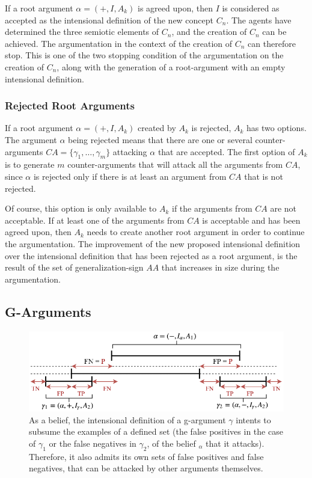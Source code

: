 If a root argument $\alpha = (+,I,A_{k})$ is agreed upon, then $I$ is considered as accepted as the intensional definition of the new concept $C_{n}$. The agents have determined the three semiotic elements of $C_{n}$, and the creation of $C_{n}$ can be achieved. The argumentation in the context of the creation of $C_{n}$ can therefore stop. This is one of the two stopping condition of the argumentation on the creation of $C_{n}$, along with the generation of a root-argument with an empty intensional definition. 
 
\subsubsection{Rejected Root Arguments}

If a root argument $\alpha = (+,I,A_{k})$ created by $A_{k}$ is rejected, $A_{k}$ has two options. The argument $\alpha$ being rejected means that there are one or several counter-arguments $CA = \{\gamma_{1}, \ldots, \gamma_{m}\}$ attacking $\alpha$ that are accepted. The first option of $A_{k}$ is to generate $m$ counter-arguments that will attack all the arguments from $CA$, since $\alpha$ is rejected only if there is at least an argument from $CA$ that is not rejected.

Of course, this option is only available to $A_{k}$ if the arguments from $CA$ are not acceptable. If at least one of the arguments from $CA$ is acceptable and has been agreed upon, then $A_{k}$ needs to create another root argument in order to continue the argumentation. The improvement of the new proposed intensional definition over the intensional definition that has been rejected as a root argument, is the result of the set of generalization-sign $AA$ that increases in size during the argumentation.

\subsection{G-Arguments}
\label{sec:GArg}

\begin{figure}
    \centering
    \includegraphics[width=\textwidth]{figs/Attack.pdf}
    \caption{As a belief, the intensional definition of a g-argument $\gamma$ intents to subsume the examples of a defined set (the false positives in the case of $\gamma_{1}$ or the false negatives in $\gamma_{2}$, of the belief $_{\alpha}$ that it attacks). Therefore, it also admits its own sets of false positives and false negatives, that can be attacked by other arguments themselves.}
    \label{fig:Attack}
\end{figure}


